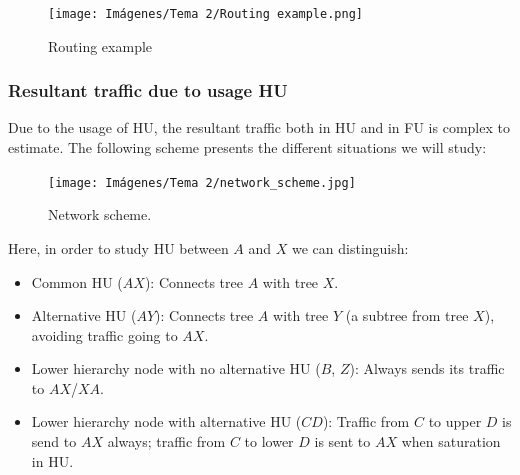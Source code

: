 \documentclass[
	12pt,
	twoside
]{book}
\begin{document}
\begin{figure}[H]
	\centering
	\texttt{[image: Imágenes/Tema 2/Routing example.png]}
	\caption{
		\label{fig:unit2_routing_example}
		Routing example
	}
\end{figure}

\subsubsection{Resultant traffic due to usage HU}

Due to the usage of HU, the resultant traffic both in HU and in FU is complex to estimate. The following scheme presents the different situations we will study:

\begin{figure}[H]
	\centering
	\texttt{[image: Imágenes/Tema 2/network\_scheme.jpg]}
	\caption{
		\label{fig:unit2_network_scheme}
		Network scheme.
	}
\end{figure}

Here, in order to study HU between $A$ and $X$ we can distinguish:
\begin{itemize}
	\item Common HU ($AX$): Connects tree $A$ with tree $X$.
	\item Alternative HU ($AY$): Connects tree $A$ with tree $Y$ (a subtree from tree $X$), avoiding traffic going to $AX$.
	\item Lower hierarchy node with no alternative HU ($B$, $Z$): Always sends its traffic to $AX$/$XA$.
	\item Lower hierarchy node with alternative HU ($CD$): Traffic from $C$ to upper $D$ is send to $AX$ always; traffic from $C$ to lower $D$ is sent to $AX$ when saturation in HU.
\end{itemize}
\end{document}
